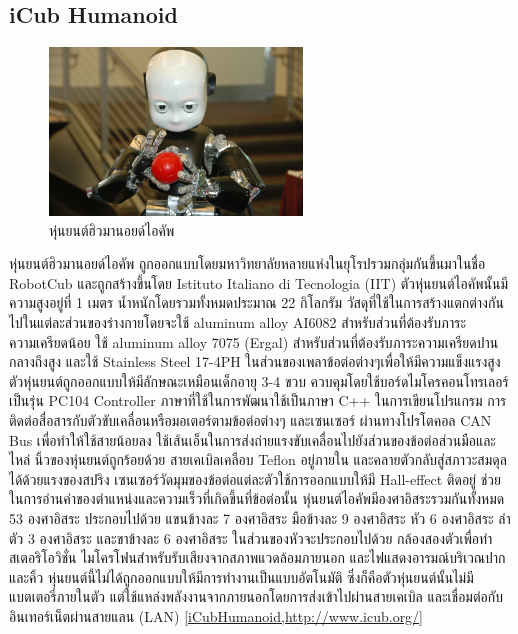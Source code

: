 \subsection*{iCub Humanoid}
\begin{figure}[ht]
    \centering
    \includegraphics[width=0.6\textwidth]{chapter2/images/icub-1.jpg}
    \caption{หุ่นยนต์ฮิวมานอยด์ไอคัพ}
    \label{fig:icub_humanoid}
\end{figure}
หุ่นยนต์ฮิวมานอยด์ไอคัพ ถูกออกแบบโดยมหาวิทยาลัยหลายแห่งในยุโรปรวมกลุ่มกันขึ้นมาในชื่อ RobotCub
และถูกสร้างขึ้นโดย Istituto Italiano di Tecnologia (IIT) ตัวหุ่นยนต์ไอคัพนั้นมีความสูงอยู่ที่ 1 เมตร
น้ำหนักโดยรวมทั้งหมดประมาณ 22 กิโลกรัม วัสดุที่ใช้ในการสร้างแตกต่างกันไปในแต่ละส่วนของร่างกายโดยจะใช้
aluminum alloy AI6082 สำหรับส่วนที่ต้องรับภาระความเครียดน้อย ใช้ aluminum alloy 7075 (Ergal) สำหรับส่วนที่ต้องรับภาระความเครียดปานกลางถึงสูง
และใช้ Stainless Steel 17-4PH ในส่วนของเพลาข้อต่อต่างๆเพื่อให้มีความแข็งแรงสูง ตัวหุ่นยนต์ถูกออกแบบให้มีลักษณะเหมือนเด็กอายุ 3-4 ขวบ
ควบคุมโดยใช้บอร์ดไมโครคอนโทรเลอร์เป็นรุ่น PC104 Controller ภาษาที่ใช้ในการพัฒนาใช้เป็นภาษา C++ ในการเขียนโปรแกรม
การติดต่อสื่อสารกับตัวขับเคลื่อนหรือมอเตอร์ตามข้อต่อต่างๆ และเซนเซอร์ ผ่านทางโปรโตคอล CAN Bus เพื่อทำให้ใช้สายน้อยลง
ใช้เส้นเอ็นในการส่งถ่ายแรงขับเคลื่อนไปยังส่วนของข้อต่อส่วนมือและไหล่ นิ้วของหุ่นยนต์ถูกร้อยด้วย สายเคเบิลเคลือบ Teflon อยู่ภายใน
และคลายตัวกลับสู่สภาวะสมดุลได้ด้วยแรงของสปริง เซนเซอร์วัดมุมของข้อต่อแต่ละตัวใช้การออกแบบให้มี Hall-effect ติดอยู่
ช่วยในการอ่านค่าของตำแหน่งและความเร็วที่เกิดขึ้นที่ข้อต่อนั้น หุ่นยนต์ไอคัพมีองศาอิสระรวมกันทั้งหมด 53 องศาอิสระ
ประกอบไปด้วย แขนข้างละ 7 องศาอิสระ มือข้างละ 9 องศาอิสระ หัว 6 องศาอิสระ ลำตัว 3 องศาอิสระ และขาข้างละ 6 องศาอิสระ
ในส่วนของหัวจะประกอบไปด้วย กล้องสองตัวเพื่อทำสเตอริโอวิชั่น ไมโครโฟนสำหรับรับเสียงจากสภาพแวดล้อมภายนอก
และไฟแสดงอารมณ์บริเวณปากและคิ้ว หุ่นยนต์นี้ไม่ได้ถูกออกแบบให้มีการทำงานเป็นแบบอัตโนมัติ ซึ่งก็คือตัวหุ่นยนต์นั้นไม่มีแบตเตอรี่ภายในตัว
แต่ใช้แหล่งพลังงานจากภายนอกโดยการส่งเข้าไปผ่านสายเคเบิล และเชื่อมต่อกับอินเทอร์เน็ตผ่านสายแลน (LAN)
\ref{iCubHumanoid,http://www.icub.org/}

